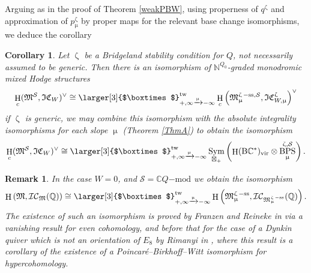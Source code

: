 \documentclass[a4paper,10pt]{amsart}
\renewcommand{\zeta}{\upzeta}
\renewcommand{\mu}{\upmu}
\newtheorem{proposition}[theorem]{Proposition}
\newtheorem{remark}[theorem]{Remark}
\newtheorem{corollary}[theorem]{Corollary}
\DeclareMathOperator{\BC}{B\mathbb{C}^*}
\newcommand{\Boxtimes}{\mbox{\larger[3]{$\boxtimes$}}}
\newcommand{\SP}{\mathcal{S}}
\newcommand{\Mst}{\mathfrak{M}}
\newcommand{\ICS}{\mathcal{IC}}
\newcommand{\ICSt}{\mathfrak{IC}}
\DeclareMathOperator{\sst}{-ss}
\DeclareMathOperator{\tw}{tw}
\DeclareMathOperator{\DT}{BPS}
\DeclareMathOperator{\Sym}{Sym}
\DeclareMathOperator{\vir}{vir}
\DeclareMathOperator{\HO}{H}
\begin{document}
Arguing as in the proof of Theorem \ref{weakPBW}, using properness of $q^{\zeta}$ and approximation of $p_{\mu}^{\zeta}$ by proper maps for the relevant base change isomorphisms, we deduce the corollary
\begin{corollary}
Let $\zeta$ be a Bridgeland stability condition for $Q$, not necessarily assumed to be generic.  Then there is an isomorphism of $\mathbb{N}^{Q_0}$-graded monodromic mixed Hodge structures
\[
\HO_c(\Mst^{\SP},\ICSt_{W})^{\vee}\cong\Boxtimes_{+, \infty\xrightarrow{\mu} -\infty}^{\tw}\HO_c\left(\Mst^{\zeta\sst,\SP}_{\mu},\ICSt_{W,\mu}^{\zeta}\right)^{\vee}
\]
if $\zeta$ is generic, we may combine this isomorphism with the absolute integrality isomorphisms for each slope $\mu$ (Theorem \ref{ThmA}) to obtain the isomorphism
\[
\HO_c(\Mst^{\SP},\ICSt_W)^{\vee}\cong\Boxtimes_{+, \infty\xrightarrow{\mu} -\infty}^{\tw}\Sym_{\boxtimes_+}\left(\HO(\BC)_{\vir}\otimes\DT^{\zeta,\SP}_{\mu}\right).
\]
\end{corollary}

\begin{remark}
In the case $W=0$, and $\SP=\mathbb{C}Q\mathrm{-mod}$ we obtain the isomorphism
\begin{equation}
\HO\left(\Mst,\ICS_{\Mst}(\mathbb{Q}) \right)\cong\Boxtimes_{+, \infty\xrightarrow{\mu} -\infty}^{\tw} \HO\left(\Mst_{\mu}^{\zeta\sst},\ICS_{\Mst_{\mu}^{\zeta\sst}}(\mathbb{Q})\right).
\end{equation}
The existence of such an isomorphism is proved by Franzen and Reineke in \cite{FrRe15} via a vanishing result for even cohomology, and before that for the case of a Dynkin quiver which is not an orientation of $E_8$ by Rimanyi in \cite{Ri13}, where this result is a corollary of the existence of a Poincar\'e--Birkhoff--Witt isomorphism for hypercohomology.
\end{remark}


\end{document}
